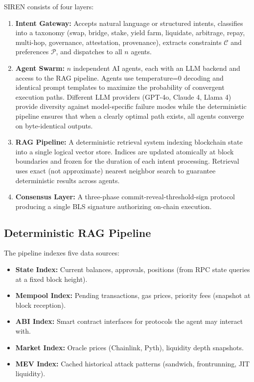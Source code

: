 \documentclass[11pt]{article}
\begin{document}
SIREN consists of four layers:
\begin{enumerate}
  \item \textbf{Intent Gateway:} Accepts natural language or structured intents, classifies into a taxonomy (swap, bridge, stake, yield farm, liquidate, arbitrage, repay, multi-hop, governance, attestation, provenance), extracts constraints $\mathcal{C}$ and preferences $\mathcal{P}$, and dispatches to all $n$ agents.
  \item \textbf{Agent Swarm:} $n$ independent AI agents, each with an LLM backend and access to the RAG pipeline. Agents use temperature=0 decoding and identical prompt templates to maximize the probability of convergent execution paths. Different LLM providers (GPT-4o, Claude 4, Llama 4) provide diversity against model-specific failure modes while the deterministic pipeline ensures that when a clearly optimal path exists, all agents converge on byte-identical outputs.
  \item \textbf{RAG Pipeline:} A deterministic retrieval system indexing blockchain state into a single logical vector store. Indices are updated atomically at block boundaries and frozen for the duration of each intent processing. Retrieval uses exact (not approximate) nearest neighbor search to guarantee deterministic results across agents.
  \item \textbf{Consensus Layer:} A three-phase commit-reveal-threshold-sign protocol producing a single BLS signature authorizing on-chain execution.
\end{enumerate}

\subsection{Deterministic RAG Pipeline}

The pipeline indexes five data sources:
\begin{itemize}
  \item \textbf{State Index:} Current balances, approvals, positions (from RPC state queries at a fixed block height).
  \item \textbf{Mempool Index:} Pending transactions, gas prices, priority fees (snapshot at block reception).
  \item \textbf{ABI Index:} Smart contract interfaces for protocols the agent may interact with.
  \item \textbf{Market Index:} Oracle prices (Chainlink, Pyth), liquidity depth snapshots.
  \item \textbf{MEV Index:} Cached historical attack patterns (sandwich, frontrunning, JIT liquidity).
\end{itemize}
\end{document}
